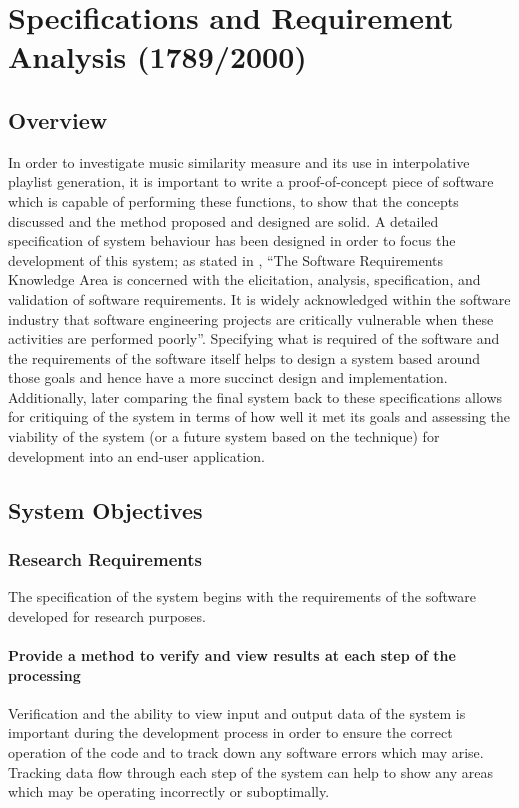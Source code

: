 %
%
\newcommand{\objective}[1]{
	\subsubsection{#1}
}
\chapter{Specifications and Requirement Analysis (1789/2000)}
\label{text:spec}
\section{Overview}
In order to investigate music similarity measure and its use in interpolative playlist generation, it is important to write a proof-of-concept piece of software which is capable of performing these functions, to show that the concepts discussed and the method proposed and designed are solid. A detailed specification of system behaviour has been designed in order to focus the development of this system; as stated in \citet{Bourque2004}, ``The Software Requirements Knowledge Area is concerned with the elicitation, analysis, specification, and validation of software requirements. It is widely acknowledged within the software industry that software engineering projects are critically vulnerable when these activities are performed poorly''. Specifying what is required of the software and the requirements of the software itself helps to design a system based around those goals and hence have a more succinct design and implementation. Additionally, later comparing the final system back to these specifications allows for critiquing of the system in terms of how well it met its goals and  assessing the viability of the system (or a future system based on the technique) for development into an end-user application.
\section{System Objectives}
\subsection{Research Requirements}
The specification of the system begins with the requirements of the software developed for research purposes. 
\objective{Provide a method to verify and view results at each step of the processing}
Verification and the ability to view input and output data of the system is important during the development process in order to ensure the correct operation of the code and to track down any software errors which may arise. Tracking data flow through each step of the system can help to show any areas which may be operating incorrectly or suboptimally.

